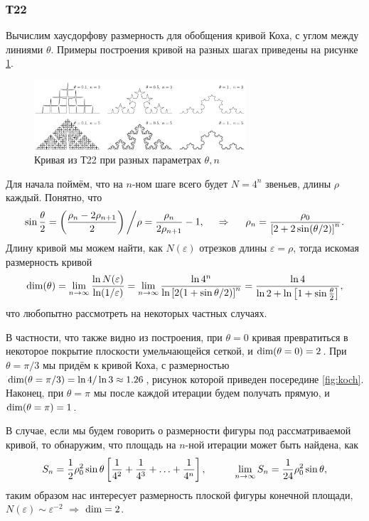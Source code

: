 
\subsubsection*{Т22}

Вычислим хаусдорфову размерность для обобщения кривой Коха, с углом между линиями $\theta$. Примеры построения кривой на разных шагах приведены на рисунке \ref{fig:koch}.
\begin{figure}[h]
    \centering
    \includegraphics[width=0.7\textwidth]{figures/koch_line.pdf}
    \caption{Кривая из Т22 при разных параметрах $\theta, n$}
    \label{fig:koch}
\end{figure}
Для начала поймём, что на $n$-ном шаге всего будет $N = 4^n$ звеньев, длины $\rho$ каждый. Понятно, что
\begin{equation*}
    \sin \frac{\theta}{2} = \left(\frac{\rho_n - 2 \rho_{n+1}}{2}\right) \bigg/ \rho = \frac{\rho_n}{2 \rho_{n+1}} - 1,
    \hspace{0.5cm} \Rightarrow \hspace{0.5cm}
    \rho_n = \frac{\rho_0}{\left[
        2 +2 \sin(\theta/2)
    \right]^n}.
\end{equation*}
Длину кривой мы можем найти, как $N(\varepsilon)$ отрезков длины $\varepsilon = \rho$, тогда искомая размерность кривой
\begin{equation*}
    \textnormal{dim}(\theta) = \lim_{n \to \infty} \frac{
    \ln N(\varepsilon)
    }{
    \ln(1/\varepsilon)
    } = \lim_{n \to \infty} 
    \frac{\ln 4^n}{\ln\left[2(1+\sin \theta/2)\right]^n} = \frac{\ln 4}{\ln 2 + \ln \left[1+\sin \frac{\theta}{2}\right]},
\end{equation*}
что любопытно рассмотреть на некоторых частных случаях. 

В частности, что также видно из построения, при $\theta = 0$ кривая превратиться в некоторое покрытие плоскости умельчающейся сеткой, и $\textnormal{dim}(\theta=0) = 2$.
При $\theta = \pi/3$ мы придём к кривой Коха, с размерностью $\textnormal{dim}(\theta= \pi/3) = \ln 4/ \ln 3 \approx 1.26$, рисунок которой приведен посередине \eqref{fig:koch}. 
Наконец, при $\theta = \pi$ мы после каждой итерации будем получать прямую, и $\textnormal{dim}(\theta= \pi) = 1$. 

В случае, если мы будем говорить о размерности фигуры под рассматриваемой кривой, то обнаружим, что площадь на $n$-ной итерации может быть найдена, как
\begin{equation*}
    S_n = \frac{1}{2} \rho_0^2 \sin \theta \left[
        \frac{1}{4^2} + \frac{1}{4^3} + \ldots + \frac{1}{4^{n}}
    \right],
    \hspace{10 mm} 
    \lim_{n \to \infty} S_n = \frac{1}{24} \rho_0^2 \sin \theta,
\end{equation*}
таким образом нас интересует размерность плоской фигуры конечной площади, $N(\varepsilon) \sim \varepsilon^{-2}$ $\Rightarrow$ $\textnormal{dim} = 2$.
